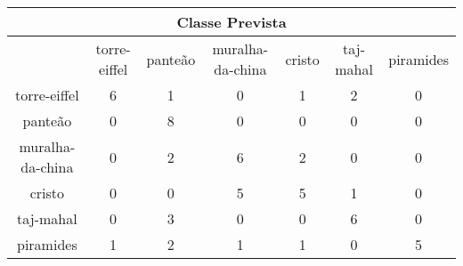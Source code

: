 \begin{tabular}{|c|c|c|c|c|c|c|}
\hline
\multicolumn{7}{|c|}{Classe Prevista}\\
\hline
 & torre-eiffel & panteão & muralha-da-china & cristo & taj-mahal & piramides\\
torre-eiffel & 6 & 1 & 0 & 1 & 2 & 0\\
panteão & 0 & 8 & 0 & 0 & 0 & 0\\
muralha-da-china & 0 & 2 & 6 & 2 & 0 & 0\\
cristo & 0 & 0 & 5 & 5 & 1 & 0\\
taj-mahal & 0 & 3 & 0 & 0 & 6 & 0\\
piramides & 1 & 2 & 1 & 1 & 0 & 5\\
\hline
\end{tabular}
